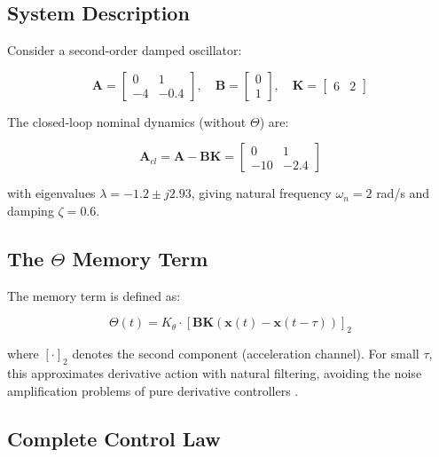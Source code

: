 \documentclass[12pt,a4paper]{article}
\begin{document}
\subsection{System Description}

Consider a second-order damped oscillator:

\begin{equation}
\mathbf{A} = \begin{bmatrix} 0 & 1 \\ -4 & -0.4 \end{bmatrix}, \quad
\mathbf{B} = \begin{bmatrix} 0 \\ 1 \end{bmatrix}, \quad
\mathbf{K} = \begin{bmatrix} 6 & 2 \end{bmatrix}
\label{eq:system}
\end{equation}

The closed-loop nominal dynamics (without $\Theta$) are:

\begin{equation}
\mathbf{A}_{cl} = \mathbf{A} - \mathbf{BK} = \begin{bmatrix} 0 & 1 \\ -10 & -2.4 \end{bmatrix}
\label{eq:acl}
\end{equation}

with eigenvalues $\lambda = -1.2 \pm j2.93$, giving natural frequency 
$\omega_n = 2$ rad/s and damping $\zeta = 0.6$.

\subsection{The $\Theta$ Memory Term}

The memory term is defined as:

\begin{equation}
\Theta(t) = K_\theta \cdot \left[\mathbf{BK}(\mathbf{x}(t) - \mathbf{x}(t-\tau))\right]_2
\label{eq:theta_def}
\end{equation}

where $[\cdot]_2$ denotes the second component (acceleration channel). 
For small $\tau$, this approximates derivative action with natural 
filtering, avoiding the noise amplification problems of pure 
derivative controllers \citep{Gu2003}.

\subsection{Complete Control Law}
\end{document}
